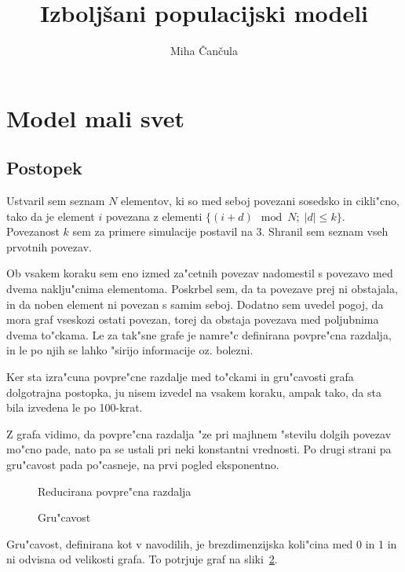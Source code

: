 \documentclass[a4paper,10pt]{article}
\title{Izbolj\v sani populacijski modeli}
\author{Miha \v Can\v cula}
\begin{document}
\maketitle

\section{Model mali svet}

\subsection{Postopek}

Ustvaril sem seznam $N$ elementov, ki so med seboj povezani sosedsko in cikli"cno, tako da je element $i$ povezana z elementi $\{(i+d) \mod N;\;|d| \leq k\}$. Povezanost $k$ sem za primere simulacije postavil na 3. Shranil sem seznam vseh prvotnih povezav. 

Ob vsakem koraku sem eno izmed za"cetnih povezav nadomestil s povezavo med dvema naklju"cnima elementoma. Poskrbel sem, da ta povezave prej ni obstajala, in da noben element ni povezan s samim seboj. Dodatno sem uvedel pogoj, da mora graf vseskozi ostati povezan, torej da obstaja povezava med poljubnima dvema to"ckama. Le za tak"sne grafe je namre"c definirana povpre"cna razdalja, in le po njih se lahko "sirijo informacije oz. bolezni. 

Ker sta izra"cuna povpre"cne razdalje med to"ckami in gru"cavosti grafa dolgotrajna postopka, ju nisem izvedel na vsakem koraku, ampak tako, da sta bila izvedena le po 100-krat. 



Z grafa vidimo, da povpre"cna razdalja "ze pri majhnem "stevilu dolgih povezav mo"cno pade, nato pa se ustali pri neki konstantni vrednosti. Po drugi strani pa gru"cavost pada po"casneje, na prvi pogled eksponentno. 

\begin{figure}[!h]
 \centering
 
\caption{Reducirana povpre"cna razdalja}
\label{fig:svet-razdalja}
\end{figure}

\begin{figure}[!h]
 \centering
 
\caption{Gru"cavost}
\label{fig:svet-grucavost}
\end{figure}

Gru"cavost, definirana kot v navodilih, je brezdimenzijska koli"cina med 0 in 1 in ni odvisna od velikosti grafa. To potrjuje graf na sliki~\ref{fig:svet-grucavost}. 
\end{document}
